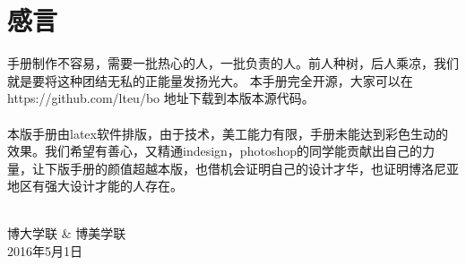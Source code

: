 
% 
%
%
%








\clearpage{\pagestyle{empty}\cleardoublepage}
\chapter*{感言}
\thispagestyle{empty}

手册制作不容易，需要一批热心的人，一批负责的人。前人种树，后人乘凉，我们就是要将这种团结无私的正能量发扬光大。
本手册完全开源，大家可以在 https://github.com/lteu/bo 地址下载到本版本源代码。\\\\
\noindent 本版手册由latex软件排版，由于技术，美工能力有限，手册未能达到彩色生动的效果。我们希望有善心，又精通indesign，photoshop的同学能贡献出自己的力量，让下版手册的颜值超越本版，也借机会证明自己的设计才华，也证明博洛尼亚地区有强大设计才能的人存在。\\\\
\begin{flushright}
博大学联 \& 博美学联 \\
2016年5月1日
\end{flushright}